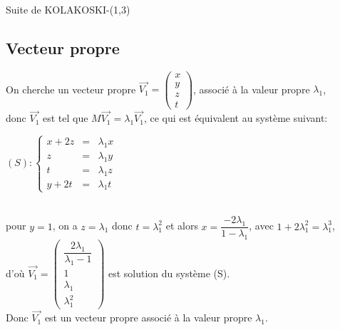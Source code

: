\documentclass[12pt,a4paper,oneside]{book}
\begin{document}
\begin{titlepage}
\begin{chapter}{Suite de KOLAKOSKI-(1,3)}
\subsection{Vecteur propre}
On cherche un vecteur propre $\overrightarrow{V_1}=\left( \begin{array}{c}
x \\ 
y \\ 
z \\ 
t
\end{array} \right)$, associé à la valeur propre  $\lambda_1$,\\
 donc $\overrightarrow{V_1}$ est tel que $M\overrightarrow{V_1}=\lambda_1\overrightarrow{V_1}$, ce qui est équivalent au système suivant: \\
\begin{center}
$(S): \left\{ \begin{array}{rcl}
x+2z & = & \lambda_1 x \\
z & = & \lambda_1 y \\
t & = & \lambda_1 z \\
y+2t&= & \lambda_1 t
\end{array} $
\end{center}\\
pour $y =1$, on a $z=\lambda_1$ donc $t=\lambda_1^2$ et alors $x=\dfrac{-2\lambda_1}{1-\lambda_1}$, avec $1+2\lambda_1^2=\lambda_1^3$,\\
 d'où $\overrightarrow{V_1}=\left(\begin{array}{c}
\dfrac{2\lambda_1}{\lambda_1-1} \\ 
1 \\ 
 \lambda_1\\ 
\lambda_1^2
\end{array} \right)$ est solution du système (S).\\
 Donc $\overrightarrow{V_1}$ est un vecteur propre associé à la valeur propre $\lambda_1$.

\end{chapter}
\end{titlepage}
\end{document}
